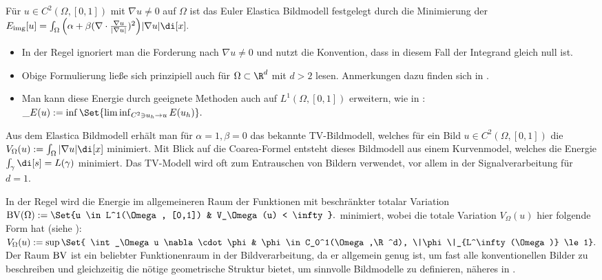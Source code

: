 \documentclass{mythesis}
\begin{document}
\begin{definition}
    Für $u \in C^2(\Omega, [0,1])$ mit $\nabla u \neq 0$ auf $\Omega$ ist das Euler Elastica Bildmodell festgelegt durch die Minimierung der 
    \begin{math}
	\Eimg[u] = \int_\Omega \Big(\alpha + \beta (\nabla \cdot \frac{\nabla u}{|\nabla u|})^2\Big)|\nabla u| \di[x].
    \end{math}
    \begin{note}
	\begin{itemize}
	    \item
		In der Regel ignoriert man die Forderung nach $\nabla u \neq 0$ und nutzt die Konvention, dass in diesem Fall der Integrand gleich null ist.
	    \item
		Obige Formulierung ließe sich prinzipiell auch für $\Omega \subset \R^d$ mit $d > 2$ lesen.
		Anmerkungen dazu finden sich in \cite{ambrosio2003direct}.
	    \item
		Man kann diese Energie durch geeignete Methoden auch auf $L^1(\Omega, [0,1])$ erweitern, wie in \cite{ambrosio2003direct}:
		\begin{math}
		    \_E(u) := \inf \Set{ \liminf_{C^2 \ni u_h \to u} E(u_h) }.
		\end{math}
	\end{itemize}
    \end{note}
\end{definition}

\begin{remark}[TV-Bildmodell]
    Aus dem Elastica Bildmodell erhält man für $\alpha = 1, \beta = 0$ das bekannte TV-Bildmodell, welches für ein Bild $u \in C^2(\Omega, [0,1])$ die 
    \begin{math}
	V_\Omega(u) := \int_\Omega |\nabla u| \di[x]
    \end{math}
    minimiert.
    Mit Blick auf die Coarea-Formel entsteht dieses Bildmodell aus einem Kurvenmodel, welches die Energie $\int_\gamma \di[s] = L(\gamma)$ minimiert.
    Das TV-Modell wird oft zum Entrauschen von Bildern verwendet, vor allem in der Signalverarbeitung für $d = 1$.

    In der Regel wird die Energie im allgemeineren Raum der Funktionen mit beschränkter totalar Variation
    \begin{math}
	\BV(\Omega) := \Set{u \in L^1(\Omega, [0,1]) & V_\Omega(u) < \infty}.
    \end{math}
    minimiert, wobei die totale Variation $V_\Omega(u)$ hier folgende Form hat (siehe \cite[§2.2]{chan2005image}):
    \begin{math}
	V_\Omega(u) := \sup\Set{ \int_\Omega u \nabla \cdot \phi & \phi \in C_0^1(\Omega,\R^d), \|\phi\|_{L^\infty(\Omega)} \le 1}.
    \end{math}
    Der Raum $\mathord{\mathrm{BV}}$ ist ein beliebter Funktionenraum in der Bildverarbeitung, da er allgemein genug ist, um fast alle konventionellen Bilder zu beschreiben und gleichzeitig die nötige geometrische Struktur bietet, um sinnvolle Bildmodelle zu definieren, näheres in \cite[§2.2]{chan2005image}.
\end{remark}
\end{document}
